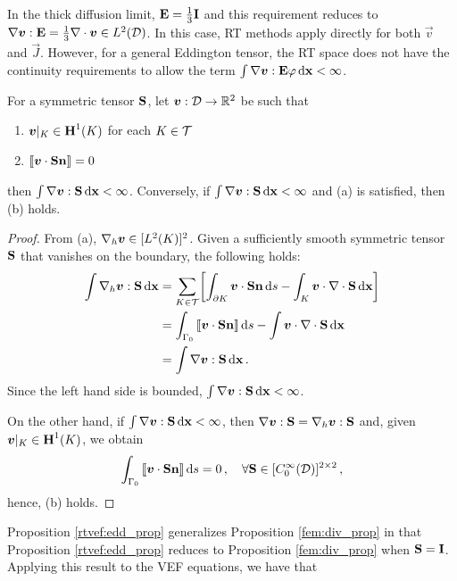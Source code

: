 \documentclass[../doc.tex]{subfiles}
\begin{document}
In the thick diffusion limit, $\E = \frac{1}{3}\I$ and this requirement reduces to $\nabla\vec{v}:\E = \frac{1}{3}\nabla\cdot\vec{v} \in L^2(\D)$. 
In this case, RT methods apply directly for both $\vec{v}$ and $\vec{J}$. However, for a general Eddington tensor, the RT space does not have the continuity requirements to allow the term $\int \nabla\vec{v} : \E\varphi \ud \x < \infty$. 
\begin{prop} \label{rtvef:edd_prop}
For a symmetric tensor $\mat{S}$, let $\vec{v} : \D\rightarrow \R^2$ be such that 
\begin{enumerate}
	\item $\vec{v}|_K \in \H^1(K)$ for each $K \in \meshT$
	\item $\jump{\vec{v}\cdot\mat{S}\n} = 0$ 
\end{enumerate}
then $\int \nabla\vec{v} : \mat{S} \ud \x < \infty$. Conversely, if $\int \nabla\vec{v} : \mat{S} \ud \x < \infty$ and (a) is satisfied, then (b) holds. 
\end{prop}
\begin{proof}
From (a), $\nablah \vec{v} \in [L^2(K)]^2$. Given a sufficiently smooth symmetric tensor $\mat{S}$ that vanishes on the boundary, the following holds: 
	\begin{equation}
	\begin{aligned}
		\int \nablah\vec{v} : \mat{S} \ud \x &= \sum_{K\in\meshT} \bracket{\int_{\partial K} \vec{v}\cdot\mat{S}\n \ud s - \int_K \vec{v}\cdot\nabla\cdot\mat{S} \ud \x} \\
		&= \int_{\Gamma_0} \jump{\vec{v}\cdot\mat{S}\n} \ud s - \int \vec{v}\cdot\nabla\cdot\mat{S} \ud \x \\
		&= \int \nabla\vec{v} : \mat{S} \ud \x \,. 
	\end{aligned}
	\end{equation}
Since the left hand side is bounded, $\int \nabla\vec{v} : \mat{S} \ud \x < \infty$. 

On the other hand, if $\int \nabla\vec{v} : \mat{S} \ud \x < \infty$, then $\nabla\vec{v}:\mat{S} = \nablah\vec{v}:\mat{S}$ and, given $\vec{v}|_K\in\H^1(K)$, we obtain 
	\begin{equation}
		\int_{\Gamma_0} \jump{\vec{v}\cdot\mat{S}\n} \ud s = 0 \,, \quad \forall \mat{S} \in [C_0^\infty(\D)]^{2\times 2} \,,
	\end{equation}
hence, (b) holds. 
\end{proof}
Proposition \ref{rtvef:edd_prop} generalizes Proposition \ref{fem:div_prop} in that Proposition \ref{rtvef:edd_prop} reduces to Proposition \ref{fem:div_prop} when $\mat{S} = \mat{I}$. Applying this result to the VEF equations, we have that 
\end{document}

